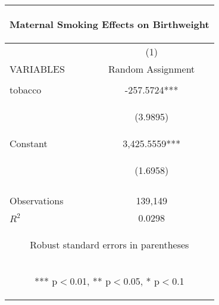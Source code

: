 \begin{center}
\begin{tabular}{lc}
\multicolumn{2}{c}{\begin{large}Maternal Smoking Effects on Birthweight\label{a2}\end{large}} \\ \hline
 & (1) \\
VARIABLES & Random Assignment \\ \hline
\vspace{4pt} & \begin{footnotesize}\end{footnotesize} \\
tobacco & -257.5724*** \\
\vspace{4pt} & \begin{footnotesize}(3.9895)\end{footnotesize} \\
Constant & 3,425.5559*** \\
 & \begin{footnotesize}(1.6958)\end{footnotesize} \\
\vspace{4pt} & \begin{footnotesize}\end{footnotesize} \\
Observations & 139,149 \\
 $R^2$ & 0.0298 \\ \hline
\multicolumn{2}{c}{\begin{footnotesize} Robust standard errors in parentheses\end{footnotesize}} \\
\multicolumn{2}{c}{\begin{footnotesize} *** p$<$0.01, ** p$<$0.05, * p$<$0.1\end{footnotesize}} \\
\end{tabular}
\end{center}
